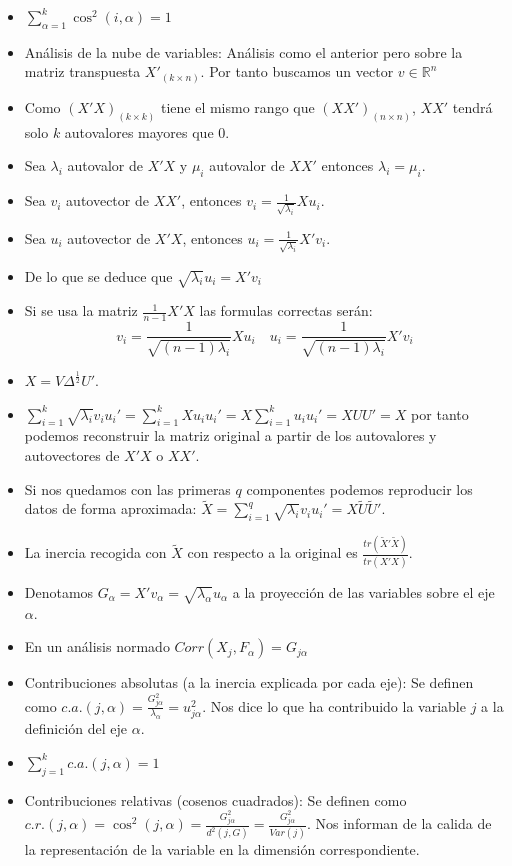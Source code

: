 \begin{itemize}
    \item $\sum_{\alpha=1}^{k}\cos^2(i,\alpha)=1$
    \item Análisis de la nube de variables: Análisis como el anterior pero sobre la matriz transpuesta $X'_{(k\times n)}$. Por tanto buscamos un vector $v\in\mathbb{R}^n$
    \item Como $(X'X)_{(k\times k)}$ tiene el mismo rango que $(XX')_{(n\times n)}$, $XX'$ tendrá solo $k$ autovalores mayores que 0.
    \item Sea $\lambda_i$ autovalor de $X'X$ y $\mu_i$ autovalor de $XX'$ entonces $\lambda_i = \mu_i$.
    \item Sea $v_i$ autovector de $XX'$, entonces $v_i = \frac{1}{\sqrt{\lambda_i}}Xu_i$.
    \item Sea $u_i$ autovector de $X'X$, entonces $u_i = \frac{1}{\sqrt{\lambda_i}}X'v_i$.
    \item De lo que se deduce que $\sqrt{\lambda_i}u_i = X'v_i$
    \item Si se usa la matriz $\frac{1}{n-1}X'X$ las formulas correctas serán:
          \[v_i=\frac{1}{\sqrt{(n-1)\lambda_i}}Xu_i \quad u_i=\frac{1}{\sqrt{(n-1)\lambda_i}}X'v_i\]
    \item $X=V\Delta^\frac{1}{2}U'$.
    \item $\sum_{i=1}^{k}\sqrt{\lambda_i}v_iu_i'=\sum_{i=1}^{k}Xu_iu_i'=X\sum_{i=1}^{k}u_iu_i'=XUU'=X$ por tanto podemos reconstruir la matriz original a partir de los autovalores y autovectores de $X'X$ o $XX'$.
    \item Si nos quedamos con las primeras $q$ componentes podemos reproducir los datos de forma aproximada: $\tilde{X}=\sum_{i=1}^{q}\sqrt{\lambda_i}v_iu_i'=X\tilde{U}\tilde{U}'$.
    \item La inercia recogida con $\tilde{X}$ con respecto a la original es $\frac{tr(\tilde{X}'\tilde{X})}{tr(X'X)}$.
    \item Denotamos $G_\alpha = X'v_\alpha = \sqrt{\lambda_\alpha}u_\alpha$ a la proyección de las variables sobre el eje $\alpha$.
    \item En un análisis normado $Corr(X_j,F_\alpha)=G_{j\alpha}$
    \item Contribuciones absolutas (a la inercia explicada por cada eje): Se definen como $c.a.(j,\alpha) = \frac{G^2_{j\alpha}}{\lambda_\alpha}=u^2_{j\alpha}$. Nos dice lo que ha contribuido la variable $j$ a la definición del eje $\alpha$.
    \item $\sum_{j=1}^{k}c.a.(j,\alpha)=1$
    \item Contribuciones relativas (cosenos cuadrados): Se definen como $c.r.(j,\alpha)=\cos^2(j,\alpha)=\frac{G^2_{j\alpha}}{d^2(j,G)}=\frac{G^2_{j\alpha}}{Var(j)}$. Nos informan de la calida de la representación de la variable en la dimensión correspondiente.

\end{itemize}
